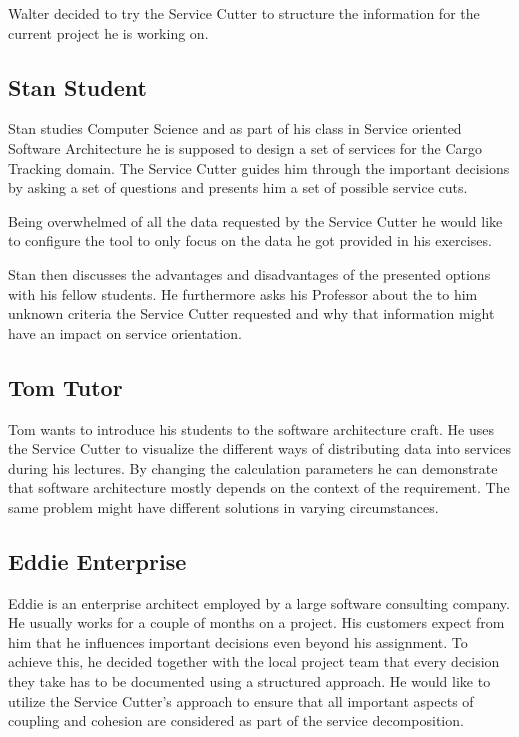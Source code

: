Walter decided to try the Service Cutter to structure the information for the current project he is working on.


\subsection{Stan Student}

Stan studies Computer Science and as part of his class in Service oriented Software Architecture he is supposed to design a set of services for the Cargo Tracking\cite{dddGithub} domain. The Service Cutter guides him through the important decisions by asking a set of questions and presents him a set of possible service cuts. 

Being overwhelmed of all the data requested by the Service Cutter he would like to configure the tool to only focus on the data he got provided in his exercises. 

Stan then discusses the advantages and disadvantages of the presented options with his fellow students. He furthermore asks his Professor about the to him unknown criteria the Service Cutter requested and why that information might have an impact on service orientation. 


\subsection{Tom Tutor}

Tom wants to introduce his students to the software architecture craft. He uses the Service Cutter to visualize the different ways of distributing data into services during his lectures. By changing the calculation parameters he can demonstrate that software architecture mostly depends on the context of the requirement. The same problem might have different solutions in varying circumstances.

\subsection{Eddie Enterprise}

Eddie is an enterprise architect employed by a large software consulting company. He usually works for a couple of months on a project. His customers expect from him that he influences important decisions even beyond his assignment. To achieve this, he decided together with the local project team that every decision they take has to be documented using a structured approach. He would like to utilize the Service Cutter's approach to ensure that all important aspects of coupling and cohesion are considered as part of the service decomposition.
